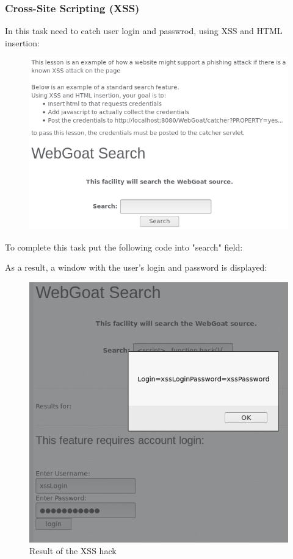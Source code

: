 \documentclass[14pt,a4paper,report]{report}
\begin{document}
\subsubsection{Cross-Site Scripting (XSS)}

In this task need to catch user login and passwrod, using XSS and HTML insertion: 

\begin{figure}[h!]
	\centering
	\includegraphics[scale = 0.71]{images/10.png}
	\caption{}
\end{figure}

To complete this task put the following code into "search" field:



As a result, a window with the user's login and password is displayed:

\begin{figure}[h!]
	\centering
	\includegraphics[scale = 0.50]{images/11.png}
	\caption{Result of the XSS hack}
\end{figure}
\end{document}
